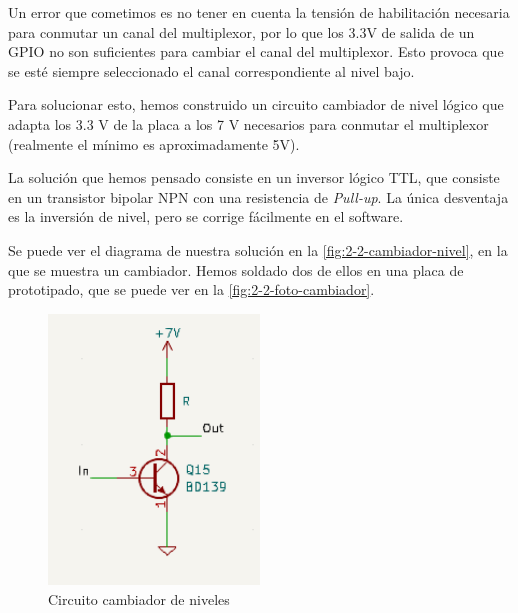 Un error que cometimos es no tener en cuenta la tensión de habilitación necesaria para conmutar un canal del multiplexor, por lo que los 3.3V de salida de un GPIO no son suficientes para cambiar el canal del multiplexor. Esto provoca que se esté siempre seleccionado el canal correspondiente al nivel bajo.

Para solucionar esto, hemos construido un circuito cambiador de nivel lógico que adapta los 3.3 V de la placa a los 7 V necesarios para conmutar el multiplexor (realmente el mínimo es aproximadamente 5V).

La solución que hemos pensado consiste en un inversor lógico TTL, que consiste en un transistor bipolar NPN con una resistencia de \textit{Pull-up}. La única desventaja es la inversión de nivel, pero se corrige fácilmente en el software.

Se puede ver el diagrama de nuestra solución en la \autoref{fig:2-2-cambiador-nivel}, en la que se muestra un cambiador. Hemos soldado dos de ellos en una placa de prototipado, que se puede ver en la \autoref{fig:2-2-foto-cambiador}.

\begin{figure}[h]
    \centering
    \includegraphics[width=0.5\textwidth]{images/2/2-2/circuitoCambiadorNivel.png}
    \caption{Circuito cambiador de niveles}
    \label{fig:label}
\end{figure}

